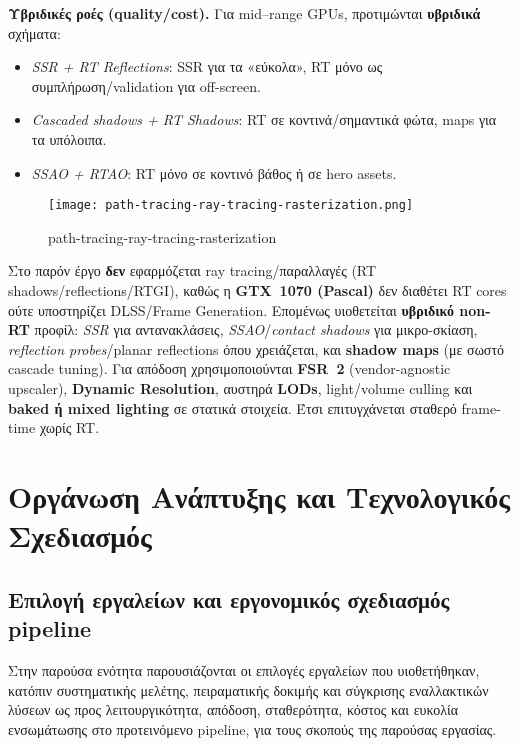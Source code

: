 \textbf{Υβριδικές ροές (quality/cost).}
Για mid–range GPUs, προτιμώνται \textbf{υβριδικά} σχήματα:
\begin{itemize}
  \item \emph{SSR + RT Reflections}: SSR για τα «εύκολα», RT μόνο ως συμπλήρωση/validation για off-screen.
  \item \emph{Cascaded shadows + RT Shadows}: RT σε κοντινά/σημαντικά φώτα, maps για τα υπόλοιπα.
  \item \emph{SSAO + RTAO}: RT μόνο σε κοντινό βάθος ή σε hero assets.
\end{itemize}

\begin{figure}[H]
    \centering
    \texttt{[image: path-tracing-ray-tracing-rasterization.png]}
    \caption{path-tracing-ray-tracing-rasterization}
    \label{fig:placeholder}
\end{figure}

Στο παρόν έργο \textbf{δεν} εφαρμόζεται ray tracing/παραλλαγές (RT shadows/reflections/RTGI), καθώς η \textbf{GTX~1070 (Pascal)} δεν διαθέτει RT cores ούτε υποστηρίζει DLSS/Frame Generation. Επομένως υιοθετείται \textbf{υβριδικό non-RT} προφίλ: \emph{SSR} για αντανακλάσεις, \emph{SSAO}/\emph{contact shadows} για μικρο-σκίαση, \emph{reflection probes}/planar reflections όπου χρειάζεται, και \textbf{shadow maps} (με σωστό cascade tuning). Για απόδοση χρησιμοποιούνται \textbf{FSR~2} (vendor-agnostic upscaler), \textbf{Dynamic Resolution}, αυστηρά \textbf{LODs}, light/volume culling και \textbf{baked ή mixed lighting} σε στατικά στοιχεία. Έτσι επιτυγχάνεται σταθερό frame-time χωρίς RT.


\chapter{Οργάνωση Ανάπτυξης και Τεχνολογικός Σχεδιασμός}
\section{Επιλογή εργαλείων και εργονομικός σχεδιασμός pipeline}

Στην παρούσα ενότητα παρουσιάζονται οι επιλογές εργαλείων που υιοθετήθηκαν, κατόπιν συστηματικής μελέτης, πειραματικής δοκιμής και σύγκρισης εναλλακτικών λύσεων ως προς λειτουργικότητα, απόδοση, σταθερότητα, κόστος και ευκολία ενσωμάτωσης στο προτεινόμενο pipeline, για τους σκοπούς της παρούσας εργασίας.

